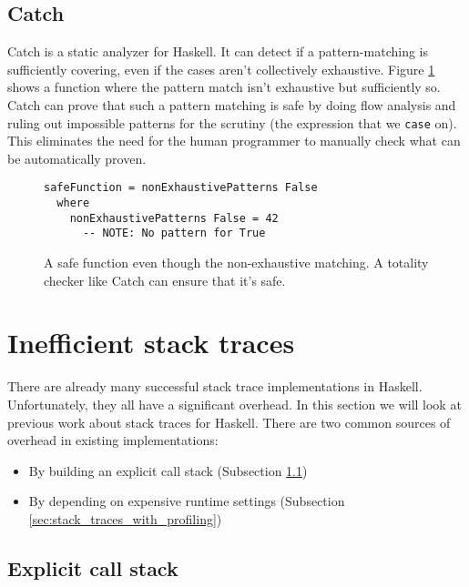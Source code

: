 \subsection{Catch}

Catch is a static analyzer for Haskell. It can detect if a pattern-matching is
sufficiently covering, even if the cases aren't collectively exhaustive. Figure
\ref{fig:catch_example} shows a function where the pattern match isn't exhaustive but
sufficiently so.
Catch can prove that such a pattern
matching is safe by doing flow analysis and ruling out impossible
patterns for the scrutiny (the expression that we \texttt{case} on).
This eliminates the need for the human programmer to manually check what can be
automatically proven. \cite{mitchell:catch_2008_9_25}

\begin{figure}
\begin{mdframed}
      \begin{verbatim}
safeFunction = nonExhaustivePatterns False
  where
    nonExhaustivePatterns False = 42
      -- NOTE: No pattern for True
      \end{verbatim}
      \caption{A safe function even though the non-exhaustive matching. A
        totality checker like Catch can ensure that it's safe.}
      \label{fig:catch_example}
\end{mdframed}
\end{figure}

\section{Inefficient stack traces} \label{sec:overhead_full}

There are already many successful stack trace implementations in
Haskell. Unfortunately, they all have a significant overhead.
In this section we will look at previous work about stack traces for
Haskell. There are two common sources of overhead in existing implementations:

\begin{itemize}
\itemsep1pt\parskip0pt
\item
  By building an explicit call stack (Subsection \ref{sec:explicit_call_stack})
\item
  By depending on expensive runtime settings (Subsection \ref{sec:stack_traces_with_profiling})
\end{itemize}

\subsection{Explicit call stack} \label{sec:explicit_call_stack}

